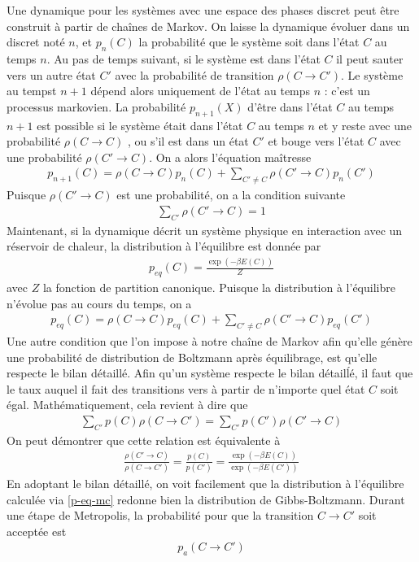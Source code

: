 Une dynamique pour les systèmes avec une espace des phases discret peut être construit à partir de chaînes de Markov. On laisse la dynamique évoluer dans un discret noté $n$, et $p_n(C)$ la probabilité que le système soit dans l'état $C$ au temps $n$. Au pas de temps suivant, si le système est dans l'état $C$ il peut sauter vers un autre état $C'$ avec la probabilité de transition $\rho(C\to C')$. Le système au tempst $n+1$ dépend alors uniquement de l'état au temps $n$ : c'est un processus markovien. La probabilité $p_{n+1}(X)$ d'être dans l'état $C$ au temps $n+1$ est possible si le système était dans l'état $C$ au temps $n$ et y reste avec une probabilité $\rho(C\to C)$ , ou s'il est dans un état $C'$ et bouge vers l'état $C$ avec une probabilité $\rho(C'\to C)$. On a alors l'équation maîtresse
\begin{align}
    p_{n+1}(C) =  \rho(C\to C) p_n(C) + \sum_{C'\neq C} \rho(C'\to C) p_n(C')
\end{align}
Puisque $\rho(C' \to C)$ est une probabilité, on a la condition suivante
\begin{align}
    \sum_{C'} \rho(C' \to C) = 1
    \label{norm}
\end{align}
Maintenant, si la dynamique décrit un système physique en interaction avec un  réservoir de chaleur, la distribution à l'équilibre est donnée par
\begin{align}
    p_{eq}(C) = \frac{\exp(-\beta E(C))}{Z}
\end{align}
avec $Z$ la fonction de partition canonique. Puisque la distribution à l'équilibre n'évolue pas au cours du temps, on a
\begin{align}
    p_{eq}(C) =  \rho(C\to C) p_{eq}(C) + \sum_{C'\neq C} \rho(C'\to C)p_{eq}(C')
    \label{p-eq-mc}
\end{align}
Une autre condition que l'on impose à notre chaîne de Markov afin qu'elle génère une probabilité de distribution de Boltzmann après équilibrage, est qu'elle respecte le bilan détaillé. Afin qu'un système respecte le bilan détailĺé, il faut que le taux auquel il fait des transitions vers à partir de n'importe quel état $C$ soit égal. Mathématiquement, cela revient à dire que
\begin{align}
    \sum_{C'} p(C) \rho(C \to C') = \sum_{C'} p(C') \rho(C' \to C)
\end{align}
On peut démontrer que cette relation est équivalente à \cite{newman_monte_1999} 
\begin{align}
    \frac{\rho(C'\to C)}{\rho(C \to C')} = \frac{p(C)}{p(C')} = \frac{\exp(-\beta E(C))}{\exp(-\beta E(C'))}
\end{align} 
En adoptant le bilan détaillé, on voit facilement que la distribution à l'équilibre calculée via \ref{p-eq-mc} redonne bien la distribution de Gibbs-Boltzmann.
Durant une étape de Metropolis, la probabilité pour que la transition $C\to C'$ soit acceptée est 
\begin{align}
    p_a(C\to C')
\end{align}


